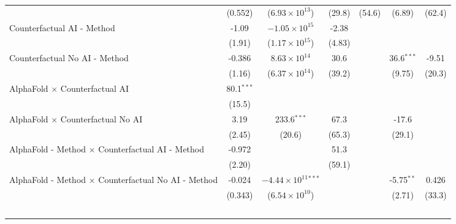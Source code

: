 \begin{tabular}{lcccccc}
                                                              & (0.552)      & ($6.93\times 10^{13}$)         & (29.8)  & (54.6)        & (6.89)       & (62.4)\\   
   Counterfactual AI - Method                                 & -1.09        & $-1.05\times 10^{15}$          & -2.38   &               &              &   \\   
                                                              & (1.91)       & ($1.17\times 10^{15}$)         & (4.83)  &               &              &   \\   
   Counterfactual No AI - Method                              & -0.386       & $8.63\times 10^{14}$           & 30.6    &               & 36.6$^{***}$ & -9.51\\   
                                                              & (1.16)       & ($6.37\times 10^{14}$)         & (39.2)  &               & (9.75)       & (20.3)\\   
   AlphaFold $\times$ Counterfactual AI                       & 80.1$^{***}$ &                                &         &               &              &   \\   
                                                              & (15.5)       &                                &         &               &              &   \\   
   AlphaFold $\times$ Counterfactual No AI                    & 3.19         & 233.6$^{***}$                  & 67.3    &               & -17.6        &   \\   
                                                              & (2.45)       & (20.6)                         & (65.3)  &               & (29.1)       &   \\   
   AlphaFold - Method $\times$ Counterfactual AI - Method     & -0.972       &                                & 51.3    &               &              &   \\   
                                                              & (2.20)       &                                & (59.1)  &               &              &   \\   
   AlphaFold - Method $\times$ Counterfactual No AI - Method  & -0.024       & $-4.44\times 10^{11}$$^{***}$  &         &               & -5.75$^{**}$ & 0.426\\   
                                                              & (0.343)      & ($6.54\times 10^{10}$)         &         &               & (2.71)       & (33.3)\\   
$$
\end{tabular}
